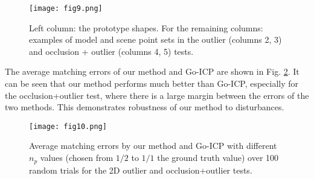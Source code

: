 \documentclass[11pt,bezier,]{article}
\begin{document}
\begin{figure}[ht]
\centering

\texttt{[image: fig9.png]}


% 
\caption{
Left column: the prototype shapes.
For the remaining columns:
examples of model and scene point sets in the %
outlier (columns 2, 3) and occlusion + outlier (columns 4, 5) tests. 
\label{rot_2D_test_data_exa}}
\end{figure}







The average matching errors  of our method and Go-ICP are shown in Fig. \ref{2D_simi_sta}.
It can be seen that our method performs much  better than Go-ICP,
especially for the occlusion+outlier test,
where there is a large margin between the errors of the two methods.
This demonstrates  robustness of our method to disturbances.

\begin{figure}[ht]
\centering
\texttt{[image: fig10.png]}

% 
%     
\caption{Average  matching errors by our method 
and Go-ICP with different $n_p$ values (chosen from $1/2$ to $1/1$ the ground truth value)
over 100 random trials
for the 2D outlier and occlusion+outlier tests.
\label{2D_simi_sta}}
\end{figure}
\end{document}
